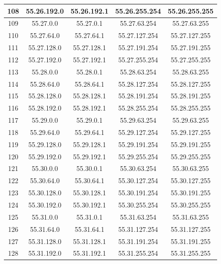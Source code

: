 \documentclass[letterpaper,12pt]{article}
\begin{document}
\begin{center}
\begin{longtable}{|c|c|c|c|c|}
                108 & 55.26.192.0 & 55.26.192.1 & 55.26.255.254 & 55.26.255.255 \\ \hline
                109 & 55.27.0.0 & 55.27.0.1 & 55.27.63.254 & 55.27.63.255 \\ \hline
                110 & 55.27.64.0 & 55.27.64.1 & 55.27.127.254 & 55.27.127.255 \\ \hline
                111 & 55.27.128.0 & 55.27.128.1 & 55.27.191.254 & 55.27.191.255 \\ \hline
                112 & 55.27.192.0 & 55.27.192.1 & 55.27.255.254 & 55.27.255.255 \\ \hline
                113 & 55.28.0.0 & 55.28.0.1 & 55.28.63.254 & 55.28.63.255 \\ \hline
                114 & 55.28.64.0 & 55.28.64.1 & 55.28.127.254 & 55.28.127.255 \\ \hline
                115 & 55.28.128.0 & 55.28.128.1 & 55.28.191.254 & 55.28.191.255 \\ \hline
                116 & 55.28.192.0 & 55.28.192.1 & 55.28.255.254 & 55.28.255.255 \\ \hline
                117 & 55.29.0.0 & 55.29.0.1 & 55.29.63.254 & 55.29.63.255 \\ \hline
                118 & 55.29.64.0 & 55.29.64.1 & 55.29.127.254 & 55.29.127.255 \\ \hline
                119 & 55.29.128.0 & 55.29.128.1 & 55.29.191.254 & 55.29.191.255 \\ \hline
                120 & 55.29.192.0 & 55.29.192.1 & 55.29.255.254 & 55.29.255.255 \\ \hline
                121 & 55.30.0.0 & 55.30.0.1 & 55.30.63.254 & 55.30.63.255 \\ \hline
                122 & 55.30.64.0 & 55.30.64.1 & 55.30.127.254 & 55.30.127.255 \\ \hline
                123 & 55.30.128.0 & 55.30.128.1 & 55.30.191.254 & 55.30.191.255 \\ \hline
                124 & 55.30.192.0 & 55.30.192.1 & 55.30.255.254 & 55.30.255.255 \\ \hline
                125 & 55.31.0.0 & 55.31.0.1 & 55.31.63.254 & 55.31.63.255 \\ \hline
                126 & 55.31.64.0 & 55.31.64.1 & 55.31.127.254 & 55.31.127.255 \\ \hline
                127 & 55.31.128.0 & 55.31.128.1 & 55.31.191.254 & 55.31.191.255 \\ \hline
                128 & 55.31.192.0 & 55.31.192.1 & 55.31.255.254 & 55.31.255.255 \\ \hline

\end{longtable}
\end{center}
\end{document}

